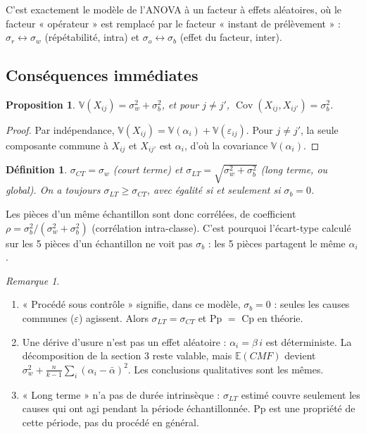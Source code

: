 \documentclass[11pt,a4paper]{article}
\theoremstyle{tq}
\newtheorem{prop}{Proposition}
\newtheorem{defi}{Définition}
\theoremstyle{remark}
\newtheorem*{rem}{Remarque}
\newcommand{\E}{\mathbb{E}}
\newcommand{\V}{\mathbb{V}}
\newcommand{\sw}{\sigma_w}
\newcommand{\sbt}{\sigma_b}
\begin{document}
C'est exactement le modèle de l'ANOVA à un facteur à effets aléatoires, où le facteur « opérateur » est remplacé par le facteur « instant de prélèvement » : $\sigma_r \leftrightarrow \sw$ (répétabilité, intra) et $\sigma_o \leftrightarrow \sbt$ (effet du facteur, inter).

\subsection{Conséquences immédiates}

\begin{prop}
$\V(X_{ij}) = \sw^2 + \sbt^2$, et pour $j \neq j'$, $\operatorname{Cov}(X_{ij},X_{ij'}) = \sbt^2$.
\end{prop}
\begin{proof}
Par indépendance, $\V(X_{ij}) = \V(\alpha_i) + \V(\varepsilon_{ij})$. Pour $j\neq j'$, la seule composante commune à $X_{ij}$ et $X_{ij'}$ est $\alpha_i$, d'où la covariance $\V(\alpha_i)$.
\end{proof}

\begin{defi}
$\sigma_{CT} = \sw$ (court terme) et $\sigma_{LT} = \sqrt{\sw^2+\sbt^2}$ (long terme, ou global). On a toujours $\sigma_{LT} \geq \sigma_{CT}$, avec égalité si et seulement si $\sbt = 0$.
\end{defi}

Les pièces d'un même échantillon sont donc corrélées, de coefficient $\rho = \sbt^2/(\sw^2+\sbt^2)$ (corrélation intra-classe). C'est pourquoi l'écart-type calculé sur les 5 pièces d'un échantillon ne voit pas $\sbt$ : les 5 pièces partagent le même $\alpha_i$.

\begin{rem}
\begin{enumerate}[nosep]
\item « Procédé sous contrôle » signifie, dans ce modèle, $\sbt = 0$ : seules les causes communes ($\varepsilon$) agissent. Alors $\sigma_{LT} = \sigma_{CT}$ et Pp $=$ Cp en théorie.
\item Une dérive d'usure n'est pas un effet aléatoire : $\alpha_i = \beta\, i$ est déterministe. La décomposition de la section 3 reste valable, mais $\E(CMF)$ devient $\sw^2 + \frac{n}{k-1}\sum_i(\alpha_i-\bar\alpha)^2$. Les conclusions qualitatives sont les mêmes.
\item « Long terme » n'a pas de durée intrinsèque : $\sigma_{LT}$ estimé couvre seulement les causes qui ont agi pendant la période échantillonnée. Pp est une propriété de cette période, pas du procédé en général.
\end{enumerate}
\end{rem}
\end{document}
